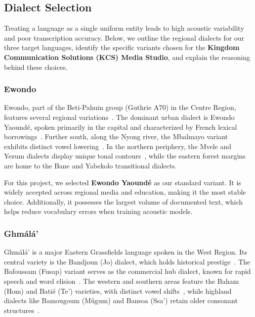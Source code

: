 \documentclass[a4paper,11pt]{article}
\begin{document}
\subsection{Dialect Selection}
\label{sec:variants}

Treating a language as a single uniform entity leads to high acoustic variability and poor transcription accuracy. Below, we outline the regional dialects for our three target languages, identify the specific variants chosen for the \textbf{Kingdom Communication Solutions (KCS) Media Studio}, and explain the reasoning behind these choices.

\subsubsection{Ewondo}
Ewondo, part of the Beti-Pahuin group (Guthrie A70) in the Centre Region, features several regional variations~\cite{abega2012langues}. The dominant urban dialect is Ewondo Yaound\'e, spoken primarily in the capital and characterized by French lexical borrowings~\cite{redden2018ewondo}. Further south, along the Nyong river, the Mbalmayo variant exhibits distinct vowel lowering~\cite{essono2010ewondo}. In the northern periphery, the Mvele and Yezum dialects display unique tonal contours~\cite{ngoh2019dialectal}, while the eastern forest margins are home to the Bane and Yabekolo transitional dialects.

For this project, we selected \textbf{Ewondo Yaound\'e} as our standard variant. It is widely accepted across regional media and education, making it the most stable choice. Additionally, it possesses the largest volume of documented text, which helps reduce vocabulary errors when training acoustic models.

\subsubsection{Gh\textopeno m\'al\'a'}
Gh\textopeno m\'al\'a' is a major Eastern Grassfields language spoken in the West Region. Its central variety is the Bandjoun (Jo) dialect, which holds historical prestige~\cite{mfonyam1994tone}. The Bafoussam (Fusap) variant serves as the commercial hub dialect, known for rapid speech and word elision~\cite{kamga2021phonetic}. The western and southern areas feature the Baham (Hom) and Bati\'e (Te') varieties, with distinct vowel shifts~\cite{hyman2003western}, while highland dialects like Bamougoum (M\^ugum) and Bansoa (Ssa') retain older consonant structures~\cite{watters2007bamileke}.
\end{document}
